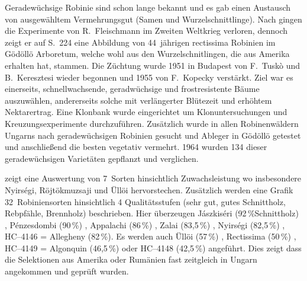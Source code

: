 \documentclass[twocolumn]{scrartcl}
\begin{document}
Geradewüchsige Robinie sind schon lange bekannt und es gab einen
Austausch von ausgewähltem Vermehrungsgut (Samen und
Wurzelschnittlinge). Nach \citep{keresztesi1983robinie} gingen die
Experimente von R.~Fleischmann im Zweiten Weltkrieg verloren, dennoch
zeigt er auf S.~224 eine Abbildung von 44~jährigen rectissima Robinien
im Gödöllö Arboretum, welche wohl aus den Wurzelschnitlingen, die
\citet{mihalyi1937robinie} aus Amerika erhalten hat, stammen. Die
Züchtung wurde 1951 in Budapest von F.~Tuskò und B.~Keresztesi wieder
begonnen und 1955 von F.~Kopecky verstärkt. Ziel war es einerseits, schnellwachsende,
geradwüchsige und frostresistente Bäume auszuwählen, andererseits solche mit
verlängerter Blütezeit und erhöhtem Nektarertrag.
Eine Klonbank wurde eingerichtet um Klonuntersuchungen
und Kreuzungsexperimente durchzuführen. Zusätzlich wurde in allen
Robinenwäldern Ungarns nach geradewüchsigen Robinien gesucht und
Ableger in Gödöllö getestet und anschließend die besten vegetativ
vermehrt. 1964 wurden 134 dieser geradewüchsigen Varietäten gepflanzt
und verglichen.

\citet{keresztesi1974robinie} zeigt eine Auswertung von 7~Sorten
hinsichtlich Zuwachsleistung wo insbesondere Nyirségi, Röjtökmuzsaji
und Üllöi hervorstechen. Zusätzlich werden eine Grafik 32~Robiniensorten
hinsichtlich 4 Qualitätsstufen (sehr gut, gutes Schnittholz,
Rebpfähle, Brennholz) beschrieben. Hier überzeugen
Jászkiséri (92\,\%Schnittholz)
, Pénzesdombi (90\,\%)
, Appalachi (86\,\%)
, Zalai (83,5\,\%)
, Nyirségi (82,5\,\%)
, HC--4146 = Allegheny (82\,\%). Es werden auch
Üllöi (57\,\%)
, Rectissima (50\,\%)
, HC--4149 = Algonquin (46,5\,\%)
oder HC--4148 (42,5\,\%)
angeführt. Dies zeigt dass die Selektionen aus Amerika oder Rumänien
fast zeitgleich in Ungarn angekommen und geprüft wurden.
\end{document}
